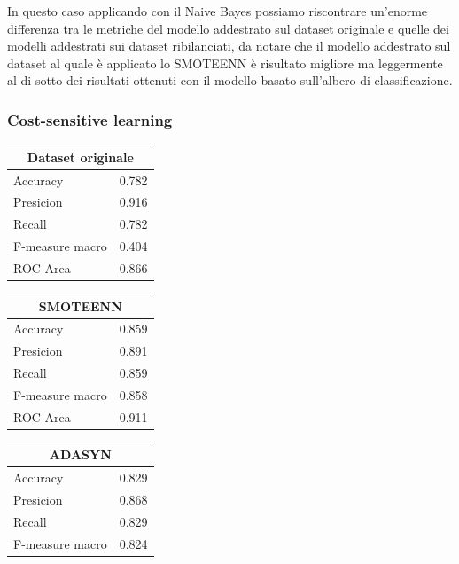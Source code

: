 \documentclass[italian,12pt,a4paper]{article}
\begin{document}
	In questo caso applicando con il Naive Bayes possiamo riscontrare un'enorme differenza tra le metriche del modello addestrato sul dataset originale e quelle dei modelli addestrati sui dataset ribilanciati, da notare che il modello addestrato sul dataset al quale è applicato lo SMOTEENN è risultato migliore ma leggermente al di sotto dei risultati ottenuti con il modello basato sull'albero di classificazione. \\
	\linebreak
	\linebreak
	
	\subsubsection{Cost-sensitive learning}
	\begin{center}
		\quad
		\begin{table}[h]
			\footnotesize
			\begin{tabular}{|p{2cm}|c|}
				\hline
				\multicolumn{2}{|c|}{Dataset originale}\\ \hline
				Accuracy & 0.782 \\ \hline
				Presicion & 0.916 \\ \hline
				Recall & 0.782 \\ \hline
				F-measure macro & 0.404 \\ \hline
				ROC Area & 0.866 \\ \hline  
				\end{tabular}
				\hfill
				\begin{tabular}{|p{2cm}|c|}
				\hline
				\multicolumn{2}{|c|}{SMOTEENN}\\ \hline
				Accuracy & 0.859 \\ \hline
				Presicion & 0.891 \\ \hline
				Recall & 0.859 \\ \hline
				F-measure macro & 0.858 \\ \hline
				ROC Area & 0.911 \\ \hline  
				\end{tabular}
					\hfill
			\begin{tabular}{|p{2cm}|r|} \hline
				\multicolumn{2}{|c|}{ADASYN}\\ \hline
				Accuracy & 0.829 \\ \hline
				Presicion & 0.868 \\ \hline
				Recall & 0.829 \\ \hline
				F-measure macro & 0.824 \\ \hline

\end{tabular}
\end{table}
\end{center}
\end{document}

